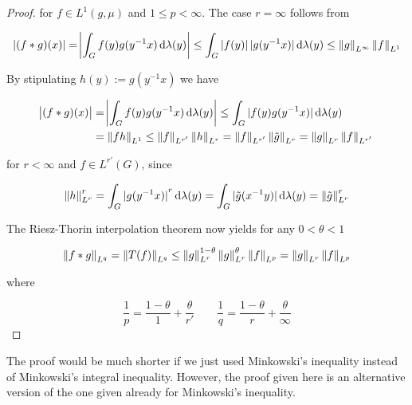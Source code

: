 \begin{remark}
\begin{proof}
	\noindent for $f \in L^1(g,\mu)$ and $1 \leq p < \infty$. The case $r = \infty$ follows from
	
	\begin{equation*}
		\abs[0]{ (f \ast g)(x) } = \abs{ \int_G f(y)g(y^{-1}x) \d\lambda(y)} \leq \int_G \abs[0]{ f(y)} \abs[0]{g(y^{-1}x)} \d\lambda(y) \leq \norm[0]{g}_{L^\infty}\norm[0]{f}_{L^1}
	\end{equation*}
	
	By stipulating $h(y) := g(y^{-1}x)$ we have 

	\begin{equation*}
		\begin{aligned}
			\abs{(f \ast g)(x)} &= \abs{ \int_G f(y)g(y^{-1}x) \d\lambda(y)} \leq \int_G \abs[0]{ f(y)g(y^{-1}x)} \d\lambda(y)\\
			&= \norm[0]{fh}_{L^1} \leq \norm[0]{f}_{L^{r'}} \norm[0]{h}_{L^r} = \norm[0]{f}_{L^{r'}} \norm[0]{\tilde{g}}_{L^r} = \norm[0]{g}_{L^r} \norm[0]{f}_{L^{r'}}
		\end{aligned}
	\end{equation*}

	\noindent for $r < \infty$ and $f \in L^{r'}( G )$, since

	\begin{equation*}
		\norm[0]{h}^r_{L^r} = \int_G \abs[0]{ g(y^{-1}x)}^r \d\lambda(y) = \int_G \abs[0]{\tilde{g}(x^{-1}y)} \d\lambda(y) = \norm[0]{\tilde{g}}^r_{L^{r}}
	\end{equation*}

	The Riesz-Thorin interpolation theorem now yields for any $0 < \theta < 1$

	\begin{equation}
		\norm[0]{f \ast g}_{L^q} = \norm[0]{T(f)}_{L^q} \leq \norm[0]{g}_{L^r}^{1 - \theta}\norm[0]{g}_{L^r}^{\theta} \norm[0]{f}_{L^p} = \norm[0]{g}_{L^r}\norm[0]{f}_{L^p}
	\end{equation}

	\noindent where 

	\begin{equation*}
		\frac{1}{p} = \frac{1 - \theta}{1} + \frac{\theta}{r'} \qquad \frac{1}{q} = \frac{1 - \theta}{r} + \frac{\theta}{\infty}
	\end{equation*}
\end{proof}
\end{remark}

\begin{remark}
	The proof would be much shorter if we just used Minkowski's inequality \textup{\cite[21--22]{grafakos:fourier:2014}} instead of Minkowski's integral inequality. However, the proof given here is an alternative version of the one given already for Minkowski's inequality.
\end{remark}
